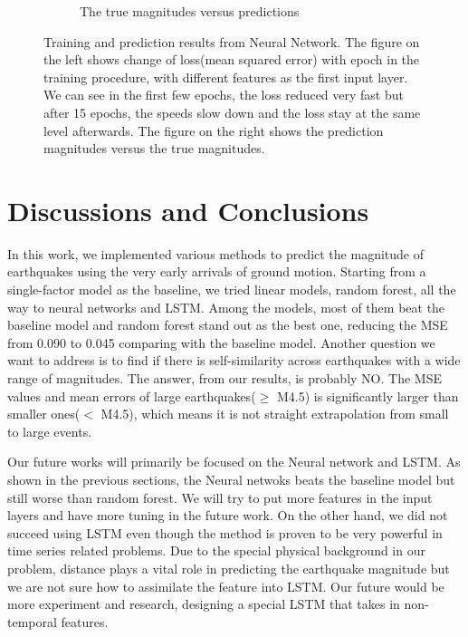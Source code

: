 \documentclass{article} %
\begin{document}
\begin{figure}[ht!]
\begin{subfigure}{0.48\textwidth}
\caption{The true magnitudes versus predictions}
\label{fig:nn_right}
\end{subfigure}
\caption{Training and prediction results from Neural Network. The figure on the left shows change of loss(mean squared error) with epoch in the training procedure, with different features as the first input layer. We can see in the first few epochs, the loss reduced very fast but after 15 epochs, the speeds slow down and the loss stay at the same level afterwards. The figure on the right shows the prediction magnitudes versus the true magnitudes.}
\label{fig:nn}
\end{figure}

\section{Discussions and Conclusions}

In this work, we implemented various methods to predict the magnitude of earthquakes using the very early arrivals of ground motion. Starting from a single-factor model as the baseline, we tried linear models, random forest, all the way to neural networks and LSTM. Among the models, most of them beat the baseline model and random forest stand out as the best one, reducing the MSE from 0.090 to 0.045 comparing with the baseline model. Another question we want to address is to find if there is self-similarity across earthquakes with a wide range of magnitudes. The answer, from our results, is probably NO. The MSE values and mean errors of large earthquakes($\geq $ M4.5) is significantly larger than smaller ones($< $ M4.5), which means it is not straight extrapolation from small to large events.

Our future works will primarily be focused on the Neural network and LSTM. As shown in the previous sections, the Neural netwoks beats the baseline model but still worse than random forest. We will try to put more features in the input layers and have more tuning in the future work. On the other hand, we did not succeed using LSTM even though the method is proven to be very powerful in time series related problems. Due to the special physical background in our problem, distance plays a vital role in predicting the earthquake magnitude but we are not sure how to assimilate the feature into LSTM. Our future would be more experiment and research, designing a special LSTM that takes in non-temporal features.
\end{document}
